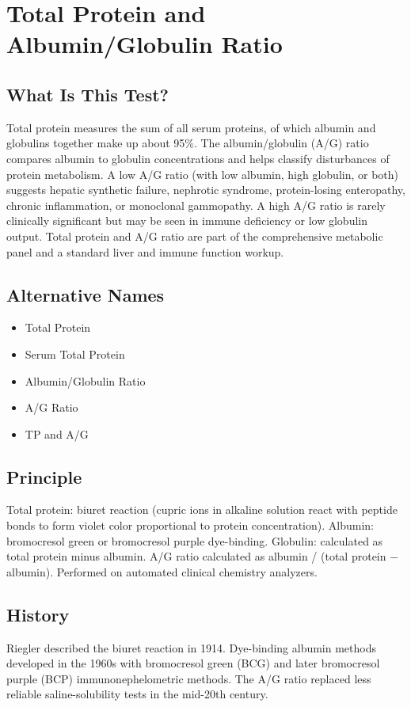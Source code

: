 \chapter{Total Protein and Albumin/Globulin Ratio}

\section*{What Is This Test?}
Total protein measures the sum of all serum proteins, of which albumin and globulins together make up about 95\%. The albumin/globulin (A/G) ratio compares albumin to globulin concentrations and helps classify disturbances of protein metabolism. A low A/G ratio (with low albumin, high globulin, or both) suggests hepatic synthetic failure, nephrotic syndrome, protein-losing enteropathy, chronic inflammation, or monoclonal gammopathy. A high A/G ratio is rarely clinically significant but may be seen in immune deficiency or low globulin output. Total protein and A/G ratio are part of the comprehensive metabolic panel and a standard liver and immune function workup.

\section*{Alternative Names}
\begin{itemize}
  \item Total Protein
  \item Serum Total Protein
  \item Albumin/Globulin Ratio
  \item A/G Ratio
  \item TP and A/G
\end{itemize}
\section*{Principle}
Total protein: biuret reaction (cupric ions in alkaline solution react with peptide bonds to form violet color proportional to protein concentration). Albumin: bromocresol green or bromocresol purple dye-binding. Globulin: calculated as total protein minus albumin. A/G ratio calculated as albumin / (total protein $-$ albumin). Performed on automated clinical chemistry analyzers.

\section*{History}
Riegler described the biuret reaction in 1914. Dye-binding albumin methods developed in the 1960s with bromocresol green (BCG) and later bromocresol purple (BCP) immunonephelometric methods. The A/G ratio replaced less reliable saline-solubility tests in the mid-20th century.


